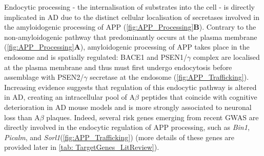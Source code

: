 \newpage
{} 
Endocytic processing - the internalisation of substrates into the cell - is directly implicated in AD due to the distinct cellular localisation of secretases involved in the amyloidogenic processing of APP\cite{Acker2019} (\cref{fig:APP_Processing}\textbf{B}). Contrary to the non-amyloidogenic pathway that predominantly occurs at the plasma membrane\cite{Sisodia1992} (\cref{fig:APP_Processing}\textbf{A}), amyloidogenic processing of APP takes place in the endosome and is spatially regulated: BACE1 and PSEN1/$\gamma$ complex are localised at the plasma membrane and thus must first undergo endocytosis before assemblage with PSEN2/$\gamma$ secretase at the endosome (\cref{fig:APP_Trafficking}). Increasing evidence suggests that regulation of this endocytic pathway is altered in AD, creating an intracellular pool of A$\beta$ peptides \cite{Peric2015} that coincide with cognitive deterioration in AD mouse models \cite{Tomiyama2010,Knobloch2007,Billings2005} and is more strongly associated to neuronal loss than A$\beta$ plaques\cite{Christensen2008}. Indeed, several risk genes emerging from recent GWAS are directly involved in the endocytic regulation of APP processing, such as \textit{Bin1}, \textit{Picalm}, and \textit{Sorl1}\cite{Schmidt2016,Dumanis2015}(\cref{fig:APP_Trafficking}) (more details of these genes are provided later in \cref{tab: TargetGenes_LitReview}).   

